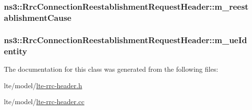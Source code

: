 \subsubsection[{\texorpdfstring{m\+\_\+reestablishment\+Cause}{m_reestablishmentCause}}]{ ns3\+::\+Rrc\+Connection\+Reestablishment\+Request\+Header\+::m\+\_\+reestablishment\+Cause\hspace{0.3cm}{\ttfamily [private]}}\hypertarget{classns3_1_1RrcConnectionReestablishmentRequestHeader_a11c01646910bd88dcd441cde3532fd5a}{}\label{classns3_1_1RrcConnectionReestablishmentRequestHeader_a11c01646910bd88dcd441cde3532fd5a}
\subsubsection[{\texorpdfstring{m\+\_\+ue\+Identity}{m_ueIdentity}}]{ ns3\+::\+Rrc\+Connection\+Reestablishment\+Request\+Header\+::m\+\_\+ue\+Identity\hspace{0.3cm}{\ttfamily [private]}}\hypertarget{classns3_1_1RrcConnectionReestablishmentRequestHeader_a35a87c6767d3bd47ef67688a98157bae}{}\label{classns3_1_1RrcConnectionReestablishmentRequestHeader_a35a87c6767d3bd47ef67688a98157bae}


The documentation for this class was generated from the following files\+:\begin{DoxyCompactItemize}
\item 
lte/model/\hyperlink{lte-rrc-header_8h}{lte-\/rrc-\/header.\+h}\item 
lte/model/\hyperlink{lte-rrc-header_8cc}{lte-\/rrc-\/header.\+cc}\end{DoxyCompactItemize}
